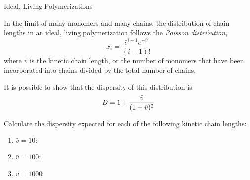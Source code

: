 \begin{activity}{Ideal, Living Polymerizations}
\begin{ctqs}
		\begin{solution}[3in]
		\end{solution}
	
\end{ctqs}

\begin{infobox}

	In the limit of many monomers and many chains, the distribution of chain lengths in an ideal, living polymerization follows the \emph{Poisson distribution},
	\begin{equation*}
		x_i = \frac{\bar v^{i-1}e^{-\bar v}}{(i-1)!}
	\end{equation*}
	where $\bar v$ is the kinetic chain length, or the number of monomers that have been incorporated into chains divided by the total number of chains.
	
	It is possible to show that the dispersity of this distribution is
	\begin{equation*}
		\PDImath = 1+\frac{\bar v}{(1+\bar v)^2}
	\end{equation*}

	\label{\labelbase:infobox:poisson}

\end{infobox}

\begin{ctqs}

	\question Calculate the dispersity expected for each of the following kinetic chain lengths: \label{\labelbase:ctq:poissondispersities}
	
		\begin{enumerate}
		
			\item $\bar v = 10$:
			
				\begin{solution}[0.25in]
				\end{solution}
			
			\item $\bar v = 100$:
			
				\begin{solution}[0.25in]
				\end{solution}
			
			\item $\bar v = 1000$:
			
				\begin{solution}[0.25in]
				\end{solution}
			
		\end{enumerate}
		

\end{ctqs}
\end{activity}
